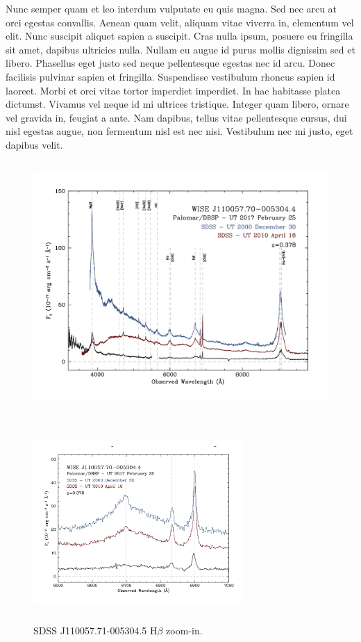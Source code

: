 \documentclass{emulateapj}
\begin{document}
Nunc semper quam et leo interdum vulputate eu quis magna. Sed nec arcu
at orci egestas convallis. Aenean quam velit, aliquam vitae viverra
in, elementum vel elit. Nunc suscipit aliquet sapien a suscipit. Cras
nulla ipsum, posuere eu fringilla sit amet, dapibus ultricies
nulla. Nullam eu augue id purus mollis dignissim sed et
libero. Phasellus eget justo sed neque pellentesque egestas nec id
arcu. Donec facilisis pulvinar sapien et fringilla. Suspendisse
vestibulum rhoncus sapien id laoreet. Morbi et orci vitae tortor
imperdiet imperdiet. In hac habitasse platea dictumst. Vivamus vel
neque id mi ultrices tristique. Integer quam libero, ornare vel
gravida in, feugiat a ante. Nam dapibus, tellus vitae pellentesque
cursus, dui nisl egestas augue, non fermentum nisl est nec
nisi. Vestibulum nec mi justo, eget dapibus velit.
\begin{figure}
  \includegraphics[width=17.00cm, height=9.50cm, trim=0.0cm 0.0cm 0.0cm 0.0cm, clip]
  {../plots/w1100m0052_sdss.jpg}
  \centering
  \caption[]{  } 
\label{fig:w1100m0052_sdss}
\end{figure}

\begin{figure}
  \includegraphics[width=8.00cm, height=7.50cm, trim=0.0cm 0.0cm 0.0cm 0.0cm, clip]
  {../plots/w1100m0052_hbeta.jpg}
  \centering
  \caption[]{SDSS J110057.71-005304.5 H$\beta$ zoom-in.}
 \label{fig:w1100m0052_hbeta}
\end{figure}
\end{document}
